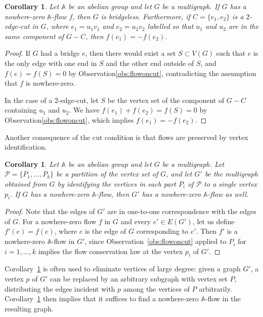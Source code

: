 \documentclass[12pt,twoside,openright,a4paper]{book}
\newtheorem{corollary}[theorem]{Corollary}
\begin{document}
\begin{corollary}\label{cor:smallcutflow}
Let $\mathbb{A}$ be an abelian group and let $G$ be a multigraph.  If $G$ has a nowhere-zero $\mathbb{A}$-flow $f$,
then $G$ is bridgeless.  Furthermore, if $C=\{e_1,e_2\}$ is a $2$-edge-cut in $G$, where $e_1=u_1v_1$ and $e_2=u_2v_2$
labelled so that $u_1$ and $u_2$ are in the same component of $G-C$, then $f(e_1)=-f(e_2)$.
\end{corollary}
\begin{proof}
If $G$ had a bridge $e$, then there would exist a set $S\subset V(G)$ such that $e$ is the only edge with one end in $S$ and
the other end outside of $S$, and $f(e)=f(S)=0$ by Observation\ref{obs:flowoncut}, contradicting the assumption
that $f$ is nowhere-zero.

In the case of a $2$-edge-cut, let $S$ be the vertex set of the component of $G-C$ containing $u_1$ and $u_2$.
We have $f(e_1)+f(e_2)=f(S)=0$ by Observation\ref{obs:flowoncut}, which implies $f(e_1)=-f(e_2)$.
\end{proof}

Another consequence of the cut condition is that flows are preserved by vertex identification.
\begin{corollary}\label{cor:contractflow}
Let $\mathbb{A}$ be an abelian group and let $G$ be a multigraph.  Let $\mathcal{P}=\{P_1,\ldots, P_k\}$ be a partition
of the vertex set of $G$, and let $G'$ be the multigraph obtained from $G$ by identifying the vertices in each part $P_i$ of $\mathcal{P}$
to a single vertex $p_i$.  If $G$ has a nowhere-zero $\mathbb{A}$-flow, then $G'$ has a nowhere-zero $\mathbb{A}$-flow as well.
\end{corollary}
\begin{proof}
Note that the edges of $G'$ are in one-to-one correspondence with the edges of $G$.  For a nowhere-zero flow $f$ in $G$
and every $e'\in E(G')$, let us define $f'(e)=f(e)$, where $e$ is the edge of $G$ corresponding to $e'$.  Then
$f'$ is a nowhere-zero $\mathbb{A}$-flow in $G'$, since Observation~\ref{obs:flowoncut} applied to $P_i$ for $i=1,\ldots, k$
implies the flow conservation law at the vertex $p_i$ of $G'$.
\end{proof}

Corollary~\ref{cor:contractflow} is often used to eliminate vertices of large degree: given a graph $G'$, a vertex $p$ of $G'$
can be replaced by an arbitrary subgraph with vertex set $P$, distributing the edges incident with $p$ among the vertices of $P$
arbitrarily.  Corollary~\ref{cor:contractflow} then implies that it suffices to find a nowhere-zero $\mathbb{A}$-flow in the resulting
graph.
\end{document}
